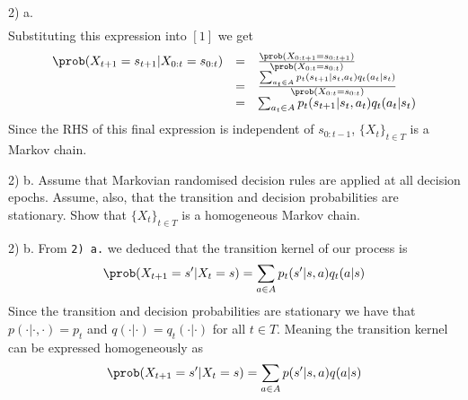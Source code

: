 \documentclass[11pt,a4paper]{article}
\begin{document}
\begin{answer}{2) a.}
\[\begin{array}{rl}
  \end{array}\]
  Substituting this expression into $[1]$ we get
  \[\begin{array}{rcl}
    \prob(X_{t+1}=s_{t+1}|X_{0:t}=s_{0:t})&=&\frac{\prob(X_{0:t+1}=s_{0:t+1})}{\prob(X_{0:t}=s_{0:t})}\\
    &=&\frac{\sum_{a_t\in A}p_t(s_{t+1}|s_t,a_t)q_t(a_t|s_t)}{\prob(X_{0:t}=s_{0:t})}\\
    &=&\sum_{a_t\in A}p_t(s_{t+1}|s_t,a_t)q_t(a_t|s_t)
  \end{array}\]
  Since the RHS of this final expression is independent of $s_{0:t-1}$, $\{X_t\}_{t\in T}$ is a Markov chain.
\end{answer}

\begin{question}{2) b.}
  Assume that Markovian randomised  decision rules are applied at all decision epochs. Assume, also, that the transition and decision probabilities are stationary. Show that $\{X_t\}_{t\in T}$ is a homogeneous Markov chain.
\end{question}

\begin{answer}{2) b.}
  From \texttt{2) a.} we deduced that the transition kernel of our process is
  \[ \prob(X_{t+1}=s'|X_t=s)=\sum_{a\in A}p_t(s'|s,a)q_t(a|s) \]
  Since the transition and decision probabilities are stationary we have that $p(\cdot|\cdot,\cdot)=p_t$ and $q(\cdot|\cdot)=q_t(\cdot|\cdot)$ for all $t\in T$. Meaning the transition kernel can be expressed homogeneously as
  \[ \prob(X_{t+1}=s'|X_t=s)=\sum_{a\in A}p(s'|s,a)q(a|s) \]
\end{answer}
\end{document}
